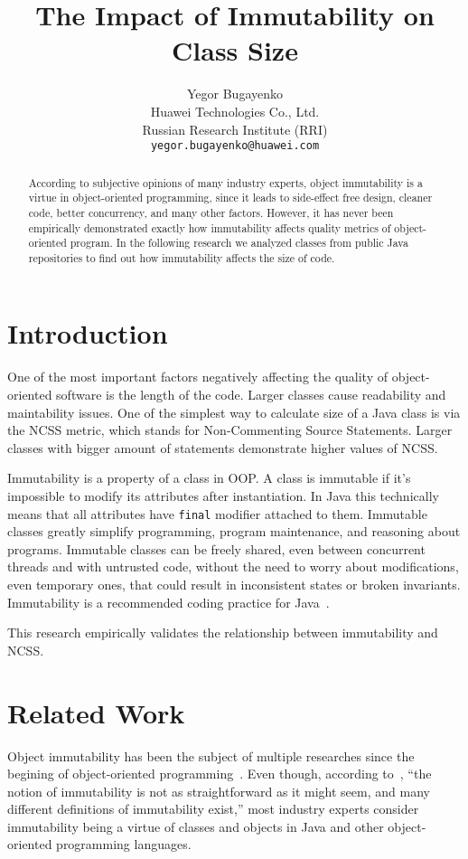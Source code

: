 \documentclass[12pt]{article}
\title{The Impact of Immutability on Class Size}
\author{Yegor Bugayenko\\Huawei Technologies Co., Ltd.\\Russian Research Institute (RRI)\\\texttt{yegor.bugayenko@huawei.com}}{}{}
\begin{document}
\raggedbottom
\maketitle

\begin{abstract}
According to subjective opinions of many industry experts,
object immutability is a virtue in object-oriented programming, since it
leads to side-effect free design, cleaner code, better concurrency,
and many other factors. However, it has never been empirically
demonstrated exactly how immutability affects quality metrics of
object-oriented program. In the following research we analyzed
\thetotaljavafiles{} classes from \thetotalrepos{} public Java repositories
to find out how immutability affects the size of code.
\end{abstract}

\section{Introduction}

One of the most important factors negatively affecting the quality
of object-oriented software is the length of the code. Larger classes
cause readability and maintability issues. One of the simplest way
to calculate size of a Java class is via the NCSS metric, which
stands for Non-Commenting Source Statements. Larger classes with bigger
amount of statements demonstrate higher values of NCSS.

Immutability is a property of a class in OOP. A class is immutable if
it's impossible to modify its attributes after instantiation. In Java this
technically means that all attributes have \texttt{final} modifier attached
to them.
Immutable classes greatly simplify programming, program maintenance, and
reasoning about programs. Immutable classes can be freely shared, even between
concurrent threads and with untrusted code, without the need to worry
about modifications, even temporary ones, that could result in
inconsistent states or broken invariants.
Immutability is a recommended coding practice for Java~\citep{bloch2016}.

This research empirically validates the relationship between immutability
and NCSS.

\section{Related Work}

Object immutability has been the subject of multiple researches since
the begining of object-oriented programming~\citep{hakonen1999,porat2000,lea2000}.
Even though, according to~\citet{potanin2013},
``the notion of immutability is not as straightforward as it might seem, and many
different definitions of immutability exist,'' most industry experts consider
immutability being a virtue of classes and objects in Java and other
object-oriented programming languages.
\end{document}
